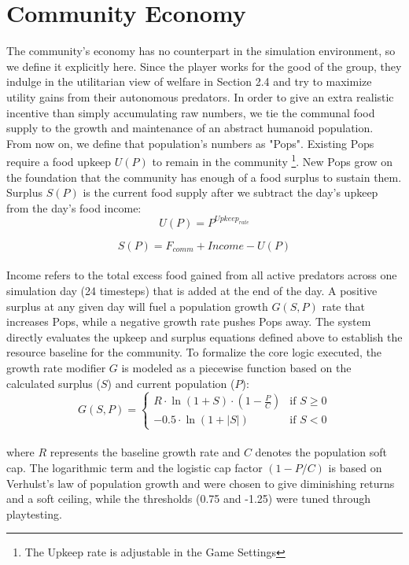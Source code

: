 \documentclass[12pt,a4paper]{report}
\begin{document}
	\section{Community Economy}

	The community’s economy has no counterpart in the simulation environment, so we define it explicitly here. Since the player works for the good of the group, they indulge in the utilitarian view of welfare in Section 2.4 and try to maximize utility gains from their autonomous predators. In order to give an extra realistic incentive than simply accumulating raw numbers, we tie the communal food supply to the growth and maintenance of an abstract humanoid population. \\

	From now on, we define that population's numbers as "Pops". Existing Pops require a food upkeep $U(P)$ to remain in the community \footnote{The Upkeep rate is adjustable in the Game Settings}. New Pops grow on the foundation that the community has enough of a food surplus to sustain them. Surplus $S(P)$ is the current food supply after we subtract the day's upkeep from the day's food income: \\

	\[ U(P) = P^{Upkeep_{rate}} \]

	\[ S(P) = F_{comm} + Income - U(P) \] \\

	Income refers to the total excess food gained from all active predators across one simulation day (24 timesteps) that is added at the end of the day. A positive surplus at any given day will fuel a population growth $G(S, P)$ rate that increases Pops, while a negative growth rate pushes Pops away. The system directly evaluates the upkeep and surplus equations defined above to establish the resource baseline for the community. To formalize the core logic executed, the growth rate modifier $G$ is modeled as a piecewise function based on the calculated surplus ($S$) and current population ($P$): \\

	\[
	G(S, P) = 
	\begin{cases} 
	R \cdot \ln(1 + S) \cdot \left(1 - \frac{P}{C}\right) & \text{if } S \ge 0 \\[8pt]
	-0.5 \cdot \ln(1 + |S|) & \text{if } S < 0 
	\end{cases}
	\] \\

	where $R$ represents the baseline growth rate and $C$ denotes the population soft cap. The logarithmic term and the logistic cap factor $(1 - P/C)$ is based on Verhulst's law of population growth \cite{Bacaer2011} and were chosen to give diminishing returns and a soft ceiling, while the thresholds (0.75 and -1.25) were tuned through playtesting. \\
\end{document}
